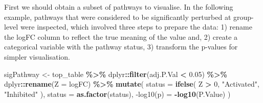 \documentclass[9pt,a4paper,]{extarticle}
\newenvironment{Shaded}{\begin{snugshade}}{\end{snugshade}}
\newcommand{\AttributeTok}[1]{\textcolor[rgb]{0.13,0.29,0.53}{#1}}
\newcommand{\DecValTok}[1]{\textcolor[rgb]{0.00,0.00,0.81}{#1}}
\newcommand{\FloatTok}[1]{\textcolor[rgb]{0.00,0.00,0.81}{#1}}
\newcommand{\FunctionTok}[1]{\textcolor[rgb]{0.13,0.29,0.53}{\textbf{#1}}}
\newcommand{\NormalTok}[1]{#1}
\newcommand{\OtherTok}[1]{\textcolor[rgb]{0.56,0.35,0.01}{#1}}
\newcommand{\SpecialCharTok}[1]{\textcolor[rgb]{0.81,0.36,0.00}{\textbf{#1}}}
\newcommand{\StringTok}[1]{\textcolor[rgb]{0.31,0.60,0.02}{#1}}
\begin{document}
First we should obtain a subset of pathways to visualise.
In the following example, pathways that were considered to be significantly perturbed at group-level were inspected, which involved three steps to prepare the data: 1) rename the logFC column to reflect the true meaning of the value and, 2) create a categorical variable with the pathway status, 3) transform the p-values for simpler visualisation.

\begin{Shaded}
\begin{Highlighting}[]
\NormalTok{sigPathway }\OtherTok{\textless{}{-}}\NormalTok{ top\_table }\SpecialCharTok{\%\textgreater{}\%}
\NormalTok{  dplyr}\SpecialCharTok{::}\FunctionTok{filter}\NormalTok{(adj.P.Val }\SpecialCharTok{\textless{}} \FloatTok{0.05}\NormalTok{) }\SpecialCharTok{\%\textgreater{}\%} 
\NormalTok{  dplyr}\SpecialCharTok{::}\FunctionTok{rename}\NormalTok{(}\AttributeTok{Z =}\NormalTok{ logFC) }\SpecialCharTok{\%\textgreater{}\%} 
  \FunctionTok{mutate}\NormalTok{(}
    \AttributeTok{status =} \FunctionTok{ifelse}\NormalTok{(}
\NormalTok{        Z }\SpecialCharTok{\textgreater{}} \DecValTok{0}\NormalTok{, }\StringTok{"Activated"}\NormalTok{, }\StringTok{"Inhibited"}
\NormalTok{    ),}
    \AttributeTok{status =} \FunctionTok{as.factor}\NormalTok{(status),}
    \StringTok{\textasciigrave{}}\AttributeTok{{-}log10(p)}\StringTok{\textasciigrave{}} \OtherTok{=} \SpecialCharTok{{-}}\FunctionTok{log10}\NormalTok{(P.Value)}
\NormalTok{  )}
\end{Highlighting}
\end{Shaded}
\end{document}
